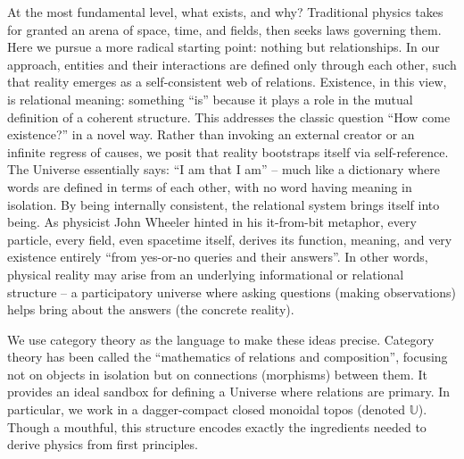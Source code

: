 \documentclass{article}
\begin{document}
At the most fundamental level, what exists, and why? Traditional physics takes for granted an arena of space, time, and fields, then seeks laws governing them. Here we pursue a more radical starting point: nothing but relationships. In our approach, entities and their interactions are defined only through each other, such that reality emerges as a self-consistent web of relations. Existence, in this view, is relational meaning: something ``is'' because it plays a role in the mutual definition of a coherent structure. This addresses the classic question ``How come existence?'' in a novel way. Rather than invoking an external creator or an infinite regress of causes, we posit that reality bootstraps itself via self-reference. The Universe essentially says: ``I am that I am'' -- much like a dictionary where words are defined in terms of each other, with no word having meaning in isolation. By being internally consistent, the relational system brings itself into being. As physicist John Wheeler hinted in his it-from-bit metaphor, every particle, every field, even spacetime itself, derives its function, meaning, and very existence entirely ``from yes-or-no queries and their answers''\cite{wheeler1989}. In other words, physical reality may arise from an underlying informational or relational structure -- a participatory universe where asking questions (making observations) helps bring about the answers (the concrete reality)\cite{wheeler1989}.

We use category theory as the language to make these ideas precise. Category theory has been called the ``mathematics of relations and composition''\cite{awodey2010}, focusing not on objects in isolation but on connections (morphisms) between them. It provides an ideal sandbox for defining a Universe where relations are primary. In particular, we work in a dagger-compact closed monoidal topos (denoted $\mathbb{U}$). Though a mouthful, this structure encodes exactly the ingredients needed to derive physics from first principles.
\end{document}
